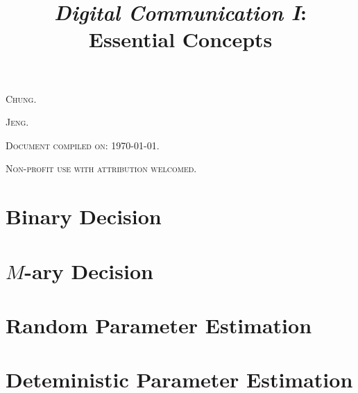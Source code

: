 


\title{\textit{\textbf{\Huge Digital Communication I}}: \\ Essential Concepts}
\date{}
\author{}
\maketitle
\allowdisplaybreaks[4]%

\vspace{-3.7cm}%
\hfill{ \textsc{Chung}. } \par \vspace{-0.8mm}
\hfill{ \textsc{Jeng}. } \par \vspace{-0.8mm}
\hfill{\textsc{ \small Document compiled on: \today. }} \par \vspace{-1.8mm}
\hfill{\textsc{ \small Non-profit use with attribution welcomed. }}
\vspace{-0.7cm} 

\newcommand*{\VpG}{\varpi}
\renewcommand*{\P}[1]{ \CF{P} \Sb{#1} }%
\newcommand*{\E}[1]{ \Tw{E} \Sb{#1} }%
\newcommand*{\Var}[1]{ \Tw{Var} \Sb{#1} }%

\setcounter{CntSubSec}{0}%

\section{Binary Decision}



\section{\(M\)-ary Decision}



\section{Random Parameter Estimation}



\section{Deteministic Parameter Estimation}




